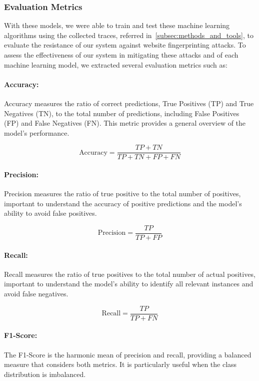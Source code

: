 \subsubsection{Evaluation Metrics}\label{subsubsec:evaluation_metrics}

With these models, we were able to train and test these machine learning algorithms using the collected traces, referred in~\cref{subsec:methods_and_tools}, to evaluate the resistance of our system against website fingerprinting attacks. 
To assess the effectiveness of our system in mitigating these attacks and of each machine learning model, we extracted several evaluation metrics such as:

\paragraph{Accuracy:} Accuracy measures the ratio of correct predictions, True Positives (TP) and True Negatives (TN), to the total number of predictions, including False Positives (FP) and False Negatives (FN). This metric provides a general overview of the model's performance.  

\[ 
\text{Accuracy} = \frac{TP + TN}{TP + TN + FP + FN}
\]

\paragraph{Precision:} Precision measures the ratio of true positive to the total number of positives, important to understand the accuracy of positive predictions and the model's ability to avoid false positives.

\[
\text{Precision} = \frac{TP}{TP + FP}
\]


\paragraph{Recall:} Recall measures the ratio of true positives to the total number of actual positives, important to understand the model's ability to identify all relevant instances and avoid false negatives.

\[
\text{Recall} = \frac{TP}{TP + FN}
\]

\paragraph{F1-Score:} The F1-Score is the harmonic mean of precision and recall, providing a balanced measure that considers both metrics. It is particularly useful when the class distribution is imbalanced.

